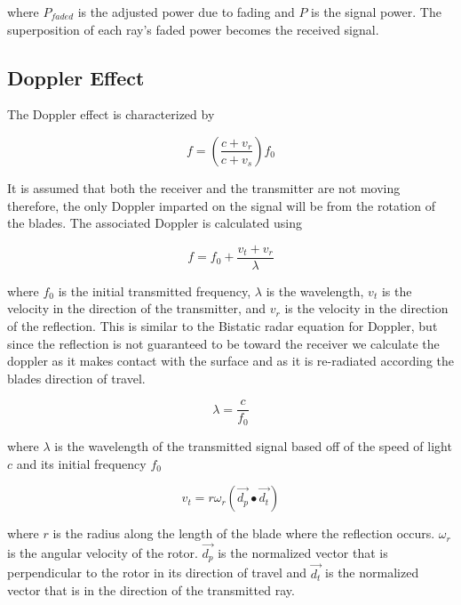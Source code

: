 where $P_{faded}$ is the adjusted power due to fading and $P$ is the signal power. The superposition of each ray's faded power becomes the received signal.

\subsection{Doppler Effect}
The Doppler effect is characterized by

\begin{equation}
	f = \left ( \frac{c + v_r}{c + v_s} \right ) f_0
	\label{eqn:formalDop}
\end{equation}

It is assumed that both the receiver and the transmitter are not moving therefore, the only Doppler imparted on the signal will be from the rotation of the blades. The associated Doppler is calculated using

\begin{equation}
	f = f_0 + \frac{v_t + v_r}{\lambda} %
	\label{eqn:observedShift}	
\end{equation}

where $f_0$ is the initial transmitted frequency, $\lambda$ is the wavelength, $v_t$ is the velocity in the direction of the transmitter, and $v_r$ is the velocity in the direction of the reflection. This is similar to the Bistatic radar equation for Doppler, but since the reflection is not guaranteed to be toward the receiver we calculate the doppler as it makes contact with the surface and as it is re-radiated according the blades direction of travel.

\begin{equation}
	\lambda = \frac{c}{f_0}
	\label{eqn:wavelength}
\end{equation}

where $\lambda$ is the wavelength of the transmitted signal based off of the speed of light $c$ and its initial frequency $f_0$

\begin{equation}
	v_t = r \omega_r (\vec{d_p} \bullet \vec{d_t})
	\label{eqn:v_t}
\end{equation}

where $r$ is the radius along the length of the blade where the reflection occurs. $\omega_r$ is the angular velocity of the rotor. $\vec{d_p}$ is the normalized vector that is perpendicular to the rotor in its direction of travel and $\vec{d_t}$ is the normalized vector that is in the direction of the transmitted ray.

